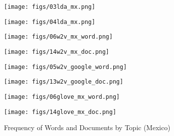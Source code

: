 \documentclass{article}
\begin{document}
\begin{figure}[H] 
    \begin{minipage}[b]{0.5\linewidth}
    \centering
  \centering
  \texttt{[image: figs/03lda\_mx.png]}
    \vspace{1ex}
  \end{minipage}
    \begin{minipage}[b]{0.5\linewidth}
    \centering
  \centering
  \texttt{[image: figs/04lda\_mx.png]}
    \vspace{1ex}
  \end{minipage}
  \begin{minipage}[b]{0.5\linewidth}
    \centering
  \centering
  \texttt{[image: figs/06w2v\_mx\_word.png]}
    \vspace{1ex}
  \end{minipage}
    \begin{minipage}[b]{0.5\linewidth}
    \centering
  \centering
  \texttt{[image: figs/14w2v\_mx\_doc.png]}
    \vspace{1ex}
  \end{minipage}
  \begin{minipage}[b]{0.5\linewidth}
    \centering
  \centering
  \texttt{[image: figs/05w2v\_google\_word.png]}
  \centering \vspace{1ex}
  \end{minipage} 
  \begin{minipage}[b]{0.5\linewidth}
    \centering
  \centering
  \texttt{[image: figs/13w2v\_google\_doc.png]}
  \centering \vspace{1ex}
  \end{minipage}
    \begin{minipage}[b]{0.5\linewidth}
    \centering
  \centering
  \texttt{[image: figs/06glove\_mx\_word.png]}
  \centering \vspace{1ex}
  \end{minipage} 
  \begin{minipage}[b]{0.5\linewidth}
    \centering
  \centering
  \texttt{[image: figs/14glove\_mx\_doc.png]}
  \centering \vspace{1ex}
  \end{minipage}
    \caption{Frequency of Words and Documents by Topic (Mexico)}
    \label{fig:chap3.fig11}
\end{figure}
\end{document}
